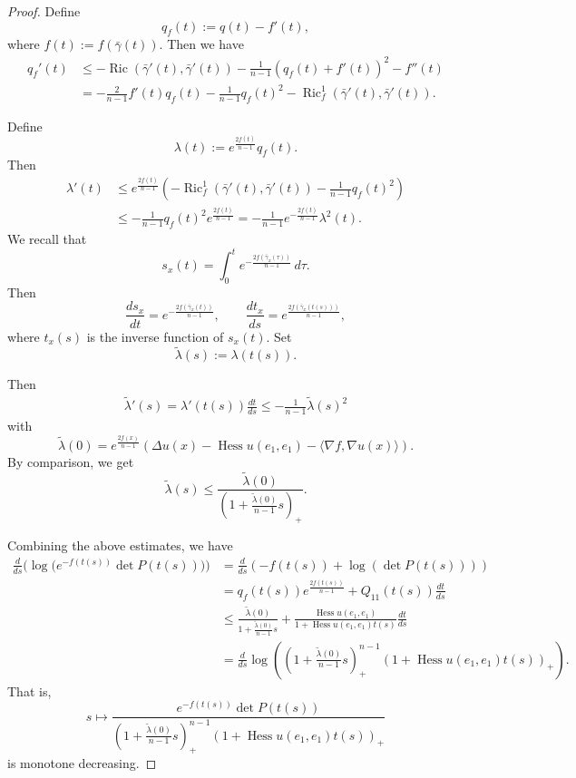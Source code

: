 \documentclass[psamsfonts]{amsart}
\theoremstyle{definition}
\theoremstyle{remark}
\DeclareMathOperator{\tr}{tr}
\DeclareMathOperator{\Ric}{Ric}
\numberwithin{equation}{section}
\begin{document}
\begin{proof}
Define
\[
q_f(t):=q(t)-f'(t),
\]
where \(f(t):=f(\bar \gamma(t))\).
Then we have
\begin{align*}
q_f'(t)
&\le -\Ric(\bar \gamma'(t),\bar \gamma'(t))
    -\frac{1}{n-1}(q_f(t)+f'(t))^2
    -f''(t)\\
&= -\frac{2}{n-1}f'(t) q_f(t)  -\frac{1}{n-1}q_f(t)^2 -\Ric_f^1(\bar \gamma'(t),\bar \gamma'(t)).
\end{align*}

Define \[
\lambda(t):=e^{\frac{2f(t)}{n-1}}q_f(t).
\]
Then
\begin{align*}
\lambda'(t)
&\leq e^{\frac{2f(t)}{n-1}}
   \left(
      -\Ric_f^1(\bar \gamma'(t),\bar \gamma'(t))
      -\frac{1}{n-1}q_f(t)^2
   \right) \\
   &\leq -\frac{1}{n-1}q_f(t)^2 e^{\frac{2f(t)}{n-1}}= -\frac{1}{n-1}e^{-\frac{2f(t)}{n-1}}\lambda^2(t).
\end{align*}
We recall that
\[
s_x(t)=\int_0^t e^{-\frac{2f(\bar \gamma_x(\tau))}{n-1}}\,d\tau.
\]
Then
\[
\frac{ds_x}{dt}=e^{-\frac{2f(\bar \gamma_x(t))}{n-1}},
\qquad
\frac{dt_x}{ds}=e^{\frac{2f(\bar\gamma_x(t(s)))}{n-1}},
\]
where \(t_x(s)\) is the inverse function of \(s_x(t)\).
Set
\[
\tilde\lambda(s):=\lambda(t(s)).
\]

Then
\begin{align*}
\tilde\lambda'(s)
=\lambda'(t(s))\frac{dt}{ds}
\le-\frac{1}{n-1}\tilde\lambda(s)^2
\end{align*}
with
\begin{equation} \tilde \lambda (0) = e^{\frac{2f(x)}{n-1}}(\Delta u (x) -\operatorname{Hess} u (e_1, e_1) -\langle \nabla f, \nabla u(x)\rangle).  \label{lambda-initial2}
\end{equation}
By comparison, we get
$$\tilde \lambda (s) \leq \frac{\tilde \lambda(0)}{\left(1+ \frac{\tilde\lambda(0)}{n-1}s\right)_+}.$$

Combining the above estimates, we have 
\begin{align*}
\frac{d}{ds}
\bigl(
\log\bigl(e^{-f(t(s))}\det P(t(s))\bigr)
\bigr)
&=
\frac{d}{ds}
\left(
-f(t(s))+\log(\det P(t(s)))
\right)\\
&=
q_f(t(s))e^{\frac{2f(t(s))}{n-1}} + Q_{11}(t(s)) \frac{dt}{ds}\\
&\leq\frac{\tilde \lambda(0)}{1+\frac{\tilde\lambda(0)}{n-1}s} + \frac{\operatorname{Hess} u (e_1,e_1)}{ 1+\operatorname{Hess} u (e_1,e_1) t(s)} \frac{dt}{ds}\\
&=
\frac{d}{ds}\log \left(\left( 1+ \frac{\tilde \lambda (0)}{n-1} s\right)^{n-1}_+\left( 1+\operatorname{Hess} u (e_1,e_1) t(s)\right)_+\right).
\end{align*}
That is,
\[
s\mapsto
\frac{e^{-f(t(s))}\det P(t(s))}{\left( 1+ \frac{\tilde \lambda (0)}{n-1} s\right)^{n-1}_+ \left( 1+ \operatorname{Hess} u (e_1,e_1) t(s)\right)_+}
\]
is monotone decreasing. 


\end{proof}
\end{document}
